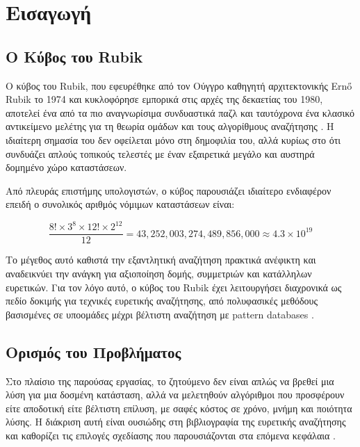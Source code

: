 
\chapter{Εισαγωγή}
\label{ch:introduction}

\section{Ο Κύβος του Rubik}
\label{sec:intro_cube}

Ο κύβος του Rubik, που εφευρέθηκε από τον Ούγγρο καθηγητή αρχιτεκτονικής Ern\H{o} Rubik το 1974 και κυκλοφόρησε εμπορικά στις αρχές της δεκαετίας του 1980, αποτελεί ένα από τα πιο αναγνωρίσιμα συνδυαστικά παζλ και ταυτόχρονα ένα κλασικό αντικείμενο μελέτης για τη θεωρία ομάδων και τους αλγορίθμους αναζήτησης \cite{joyner2008adventures,singmaster1981notes}. Η ιδιαίτερη σημασία του δεν οφείλεται μόνο στη δημοφιλία του, αλλά κυρίως στο ότι συνδυάζει απλούς τοπικούς τελεστές με έναν εξαιρετικά μεγάλο και αυστηρά δομημένο χώρο καταστάσεων.

Από πλευράς επιστήμης υπολογιστών, ο κύβος παρουσιάζει ιδιαίτερο ενδιαφέρον επειδή ο συνολικός αριθμός νόμιμων καταστάσεων είναι:

\begin{equation}
    \frac{8! \times 3^8 \times 12! \times 2^{12}}{12} = 43{,}252{,}003{,}274{,}489{,}856{,}000 \approx 4.3 \times 10^{19}
    \label{eq:state_space}
\end{equation}

Το μέγεθος αυτό καθιστά την εξαντλητική αναζήτηση πρακτικά ανέφικτη και αναδεικνύει την ανάγκη για αξιοποίηση δομής, συμμετριών και κατάλληλων ευρετικών. Για τον λόγο αυτό, ο κύβος του Rubik έχει λειτουργήσει διαχρονικά ως πεδίο δοκιμής για τεχνικές ευρετικής αναζήτησης, από πολυφασικές μεθόδους βασισμένες σε υποομάδες μέχρι βέλτιστη αναζήτηση με pattern databases \cite{scherphuis_thistlethwaite_summary,kociemba1992close,korf1997finding}.


\section{Ορισμός του Προβλήματος}
\label{sec:intro_problem}

Στο πλαίσιο της παρούσας εργασίας, το ζητούμενο δεν είναι απλώς να βρεθεί μια λύση για μια δοσμένη κατάσταση, αλλά να μελετηθούν αλγόριθμοι που προσφέρουν είτε αποδοτική είτε βέλτιστη επίλυση, με σαφές κόστος σε χρόνο, μνήμη και ποιότητα λύσης. Η διάκριση αυτή είναι ουσιώδης στη βιβλιογραφία της ευρετικής αναζήτησης και καθορίζει τις επιλογές σχεδίασης που παρουσιάζονται στα επόμενα κεφάλαια \cite{hart1968formal,korf1985depth}.

